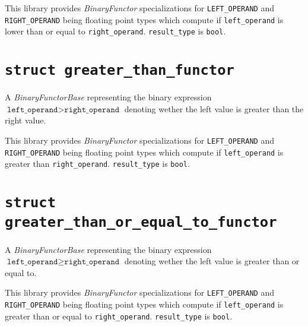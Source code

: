 \documentclass[oneside]{book}
\begin{document}
\noindent{}This library provides \textit{BinaryFunctor}         specializations for
\texttt{LEFT\_OPERAND} and   \texttt{RIGHT\_OPERAND} being     floating point types
which compute if \texttt{left\_operand}                   is lower than or equal to
\texttt{right\_operand}. \texttt{result\_type} is \texttt{bool}.

\section{\texttt{struct greater\_than\_functor}}
A \textit{BinaryFunctorBase} representing the binary expression
$\texttt{left\_operand} > \texttt{right\_operand}$
denoting wether the left value is greater than the right value.\newline

\noindent{}This library provides \textit{BinaryFunctor}         specializations for
\texttt{LEFT\_OPERAND} and   \texttt{RIGHT\_OPERAND} being     floating point types
which compute if \texttt{left\_operand}    is greater than \texttt{right\_operand}.
\texttt{result\_type} is \texttt{bool}.

\section{\texttt{struct greater\_than\_or\_equal\_to\_functor}}
A \textit{BinaryFunctorBase} representing the binary expression
$\texttt{left\_operand} \geq \texttt{right\_operand}$
denoting wether the left value is greater than or equal to.\newline

\noindent{}This library provides \textit{BinaryFunctor}         specializations for
\texttt{LEFT\_OPERAND} and   \texttt{RIGHT\_OPERAND} being     floating point types
which compute if \texttt{left\_operand}                 is greater than or equal to
\texttt{right\_operand}. \texttt{result\_type} is \texttt{bool}.
\end{document}
